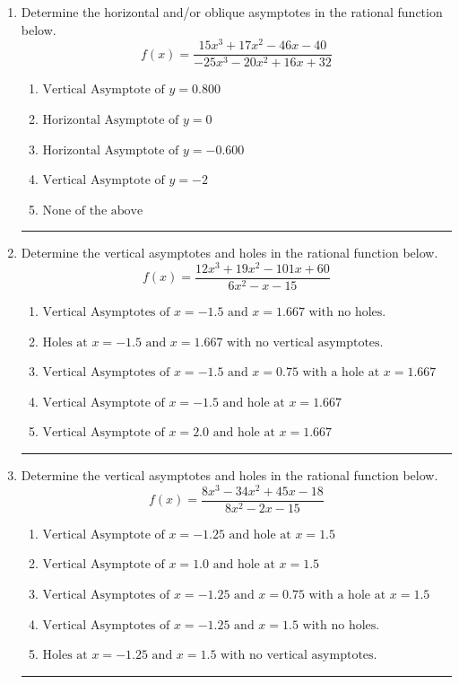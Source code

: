 \documentclass[14pt]{extbook}
\newcommand{\litem}[1]{\item#1\hspace*{-1cm}\rule{\textwidth}{0.4pt}}
\begin{document}
\begin{enumerate}
{\begin{enumerate}[label=\Alph*.]
\end{enumerate} }
\litem{
Determine the horizontal and/or oblique asymptotes in the rational function below.\[ f(x) = \frac{15x^{3} +17 x^{2} -46 x -40}{-25x^{3} -20 x^{2} +16 x + 32} \]\begin{enumerate}[label=\Alph*.]
\item \( \text{Vertical Asymptote of } y = 0.800  \)
\item \( \text{Horizontal Asymptote of } y = 0  \)
\item \( \text{Horizontal Asymptote of } y = -0.600  \)
\item \( \text{Vertical Asymptote of } y = -2  \)
\item \( \text{None of the above} \)

\end{enumerate} }
\litem{
Determine the vertical asymptotes and holes in the rational function below.\[ f(x) = \frac{12x^{3} +19 x^{2} -101 x + 60}{6x^{2} -x -15} \]\begin{enumerate}[label=\Alph*.]
\item \( \text{Vertical Asymptotes of } x = -1.5 \text{ and } x = 1.667 \text{ with no holes.} \)
\item \( \text{Holes at } x = -1.5 \text{ and } x = 1.667 \text{ with no vertical asymptotes.} \)
\item \( \text{Vertical Asymptotes of } x = -1.5 \text{ and } x = 0.75 \text{ with a hole at } x = 1.667 \)
\item \( \text{Vertical Asymptote of } x = -1.5 \text{ and hole at } x = 1.667 \)
\item \( \text{Vertical Asymptote of } x = 2.0 \text{ and hole at } x = 1.667 \)

\end{enumerate} }
\litem{
Determine the vertical asymptotes and holes in the rational function below.\[ f(x) = \frac{8x^{3} -34 x^{2} +45 x -18}{8x^{2} -2 x -15} \]\begin{enumerate}[label=\Alph*.]
\item \( \text{Vertical Asymptote of } x = -1.25 \text{ and hole at } x = 1.5 \)
\item \( \text{Vertical Asymptote of } x = 1.0 \text{ and hole at } x = 1.5 \)
\item \( \text{Vertical Asymptotes of } x = -1.25 \text{ and } x = 0.75 \text{ with a hole at } x = 1.5 \)
\item \( \text{Vertical Asymptotes of } x = -1.25 \text{ and } x = 1.5 \text{ with no holes.} \)
\item \( \text{Holes at } x = -1.25 \text{ and } x = 1.5 \text{ with no vertical asymptotes.} \)

\end{enumerate} }
\end{enumerate}
\end{document}
